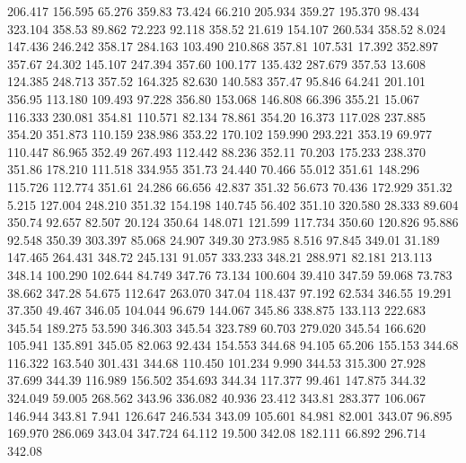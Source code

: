  206.417  156.595   65.276       359.83
  73.424   66.210  205.934       359.27
 195.370   98.434  323.104       358.53
  89.862   72.223   92.118       358.52
  21.619  154.107  260.534       358.52
   8.024  147.436  246.242       358.17
 284.163  103.490  210.868       357.81
 107.531   17.392  352.897       357.67
  24.302  145.107  247.394       357.60
 100.177  135.432  287.679       357.53
  13.608  124.385  248.713       357.52
 164.325   82.630  140.583       357.47
  95.846   64.241  201.101       356.95
 113.180  109.493   97.228       356.80
 153.068  146.808   66.396       355.21
  15.067  116.333  230.081       354.81
 110.571   82.134   78.861       354.20
  16.373  117.028  237.885       354.20
 351.873  110.159  238.986       353.22
 170.102  159.990  293.221       353.19
  69.977  110.447   86.965       352.49
 267.493  112.442   88.236       352.11
  70.203  175.233  238.370       351.86
 178.210  111.518  334.955       351.73
  24.440   70.466   55.012       351.61
 148.296  115.726  112.774       351.61
  24.286   66.656   42.837       351.32
  56.673   70.436  172.929       351.32
   5.215  127.004  248.210       351.32
 154.198  140.745   56.402       351.10
 320.580   28.333   89.604       350.74
  92.657   82.507   20.124       350.64
 148.071  121.599  117.734       350.60
 120.826   95.886   92.548       350.39
 303.397   85.068   24.907       349.30
 273.985    8.516   97.845       349.01
  31.189  147.465  264.431       348.72
 245.131   91.057  333.233       348.21
 288.971   82.181  213.113       348.14
 100.290  102.644   84.749       347.76
  73.134  100.604   39.410       347.59
  59.068   73.783   38.662       347.28
  54.675  112.647  263.070       347.04
 118.437   97.192   62.534       346.55
  19.291   37.350   49.467       346.05
 104.044   96.679  144.067       345.86
 338.875  133.113  222.683       345.54
 189.275   53.590  346.303       345.54
 323.789   60.703  279.020       345.54
 166.620  105.941  135.891       345.05
  82.063   92.434  154.553       344.68
  94.105   65.206  155.153       344.68
 116.322  163.540  301.431       344.68
 110.450  101.234    9.990       344.53
 315.300   27.928   37.699       344.39
 116.989  156.502  354.693       344.34
 117.377   99.461  147.875       344.32
 324.049   59.005  268.562       343.96
 336.082   40.936   23.412       343.81
 283.377  106.067  146.944       343.81
   7.941  126.647  246.534       343.09
 105.601   84.981   82.001       343.07
  96.895  169.970  286.069       343.04
 347.724   64.112   19.500       342.08
 182.111   66.892  296.714       342.08
